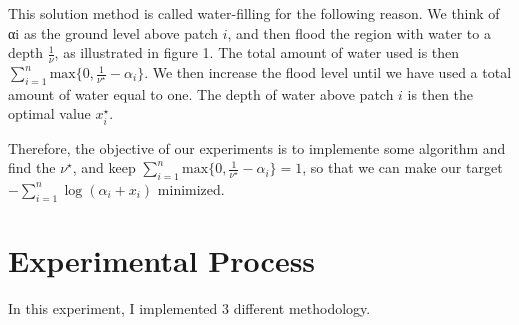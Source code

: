 \documentclass[12pt, a4paper, oneside]{article}
\begin{document}
This solution method is called water-filling for the following reason. We think of αi as the ground level above patch $i$, and then flood the region with water to a depth $\frac{1}{\nu}$, as illustrated in figure 1. 
The total amount of water used is then $\sum_{i = 1}^{n}\mbox{max}\{0, \frac{1}{\nu^{\star}} - \alpha_i\}$. 
We then increase the flood level until we have used a total amount of water equal to one. The depth of water above patch $i$ is then the optimal value $x_i^{\star}$.

Therefore, the objective of our experiments is to implemente some algorithm and find the $\nu^{\star}$, 
and keep $\sum_{i = 1}^{n}\mbox{max}\{0, \frac{1}{\nu^{\star}} - \alpha_i\} = 1$, so that we can make our target $-\sum_{i=1}^{n}\log{(\alpha_i + x_i)}$ minimized.

\section{Experimental Process}

In this experiment, I implemented 3 different methodology.
\end{document}

